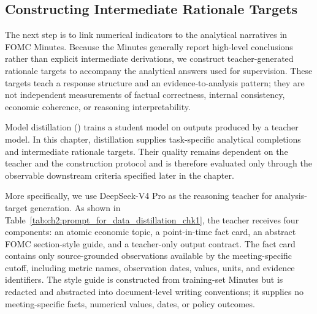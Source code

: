 

\subsection*{Constructing Intermediate Rationale Targets}


The next step is to link numerical indicators to the analytical narratives in FOMC Minutes. Because the Minutes generally report high-level conclusions rather than explicit intermediate derivations, we construct teacher-generated rationale targets to accompany the analytical answers used for supervision. These targets teach a response structure and an evidence-to-analysis pattern; they are not independent measurements of factual correctness, internal consistency, economic coherence, or reasoning interpretability.



Model distillation (\cite{hinton2015distilling}) trains a student model on outputs produced by a teacher model. In this chapter, distillation supplies task-specific analytical completions and intermediate rationale targets. Their quality remains dependent on the teacher and the construction protocol and is therefore evaluated only through the observable downstream criteria specified later in the chapter.





More specifically, we use DeepSeek-V4 Pro as the reasoning teacher for analysis-target generation. As shown in Table~\ref{tab:ch2:prompt_for_data_distillation_chk1}, the teacher receives four components: an atomic economic topic, a point-in-time fact card, an abstract FOMC section-style guide, and a teacher-only output contract. The fact card contains only source-grounded observations available by the meeting-specific cutoff, including metric names, observation dates, values, units, and evidence
identifiers. The style guide is constructed from training-set Minutes but is redacted and abstracted into document-level writing conventions; it supplies no meeting-specific facts, numerical values, dates, or policy outcomes.

